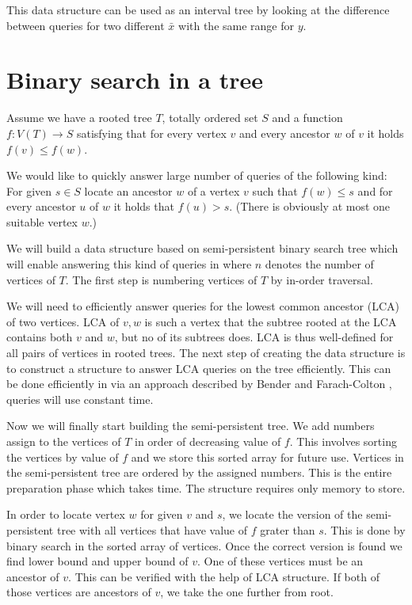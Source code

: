 This data structure can be used as an interval tree by looking at the difference between queries for two different $\bar x$ with the same range for $y$. %

\section{Binary search in a tree}

Assume we have a rooted tree $T$, totally ordered set $S$ and a function $f: V(T) \rightarrow S$ satisfying that for every vertex $v$ and every ancestor $w$ of $v$ it holds $f(v) \leq f(w)$. 


We would like to quickly answer large number of queries of the following kind: For given $s \in S$ locate an ancestor $w$ of a vertex $v$ such that $f(w) \leq s$ and for every ancestor $u$ of $w$ it holds that $f(u) > s$. (There is obviously at most one suitable vertex $w$.)

We will build a data structure based on semi-persistent binary search tree which will enable answering this kind of queries in  where $n$ denotes the number of vertices of $T$. The first step is numbering vertices of $T$ by in-order traversal. 

We will need to efficiently answer queries for the lowest common ancestor (LCA) of two vertices. LCA of $v, w$ is such a vertex that the subtree rooted at the LCA contains both $v$ and $w$, but no of its subtrees does. LCA is thus well-defined for all pairs of vertices in rooted trees. The next step of creating the data structure is to construct a structure to answer LCA queries on the tree efficiently. This can be done efficiently in  via an approach described by Bender and Farach-Colton \cite{lca}, queries will use constant time.

Now we will finally start building the semi-persistent tree. We add numbers assign to the vertices of $T$ in order of decreasing value of $f$. This involves sorting the vertices by value of $f$ and we store this sorted array for future use. Vertices in the semi-persistent tree are ordered by the assigned numbers. This is the entire preparation phase which takes  time. The structure requires only  memory to store.

In order to locate vertex $w$ for given $v$ and $s$, we locate the version of the semi-persistent tree with all vertices that have value of $f$ grater than $s$. This is done by binary search in the sorted array of vertices. Once the correct version is found we find lower bound and upper bound of $v$. One of these vertices must be an ancestor of $v$. This can be verified with the help of LCA structure. If both of those vertices are ancestors of $v$, we take the one further from root. 

